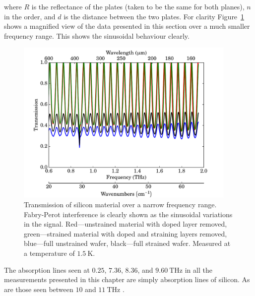 where $R$ is the reflectance of the plates (taken to be the same for both planes), $n$ in the order, and $d$ is the distance between the two plates. For clarity Figure~\ref{fig:FTS_zoom} shows a magnified view of the data presented in this section over a much smaller frequency range. This shows the sinusoidal behaviour clearly.
\begin{figure}[tb]
\begin{center}
\includegraphics[width = 0.95\textwidth]{figures/Si_FTS}
\caption[Transmission of silicon material over a narrow frequency range]{Transmission of silicon material over a narrow frequency range. Fabry-Perot interference is clearly shown as the sinusoidal variations in the signal. Red---unstrained material with doped layer removed, green---strained material with doped and straining layers removed, blue---full unstrained wafer, black---full strained wafer. Measured at a temperature of $1.5~\mathrm{K}$.}
\label{fig:FTS_zoom}
\end{center}
\end{figure}
\par 
The absorption lines seen at $0.25$, $7.36$, $8.36$, and $9.60~\mathrm{THz}$ in all the measurements presented in this chapter are simply absorption lines of silicon. As are those seen between $10$ and $11~\mathrm{THz}$ \parencite{Kramida2014,Nahar1993}.
%
